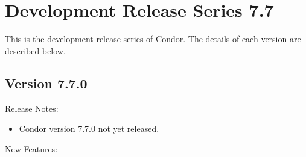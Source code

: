 
\section{\label{sec:History-7-7}Development Release Series 7.7}

This is the development release series of Condor.
The details of each version are described below.

\subsection*{\label{sec:New-7-7-0}Version 7.7.0}

\noindent Release Notes:

\begin{itemize}

\item Condor version 7.7.0 not yet released.

\end{itemize}


\noindent New Features:

